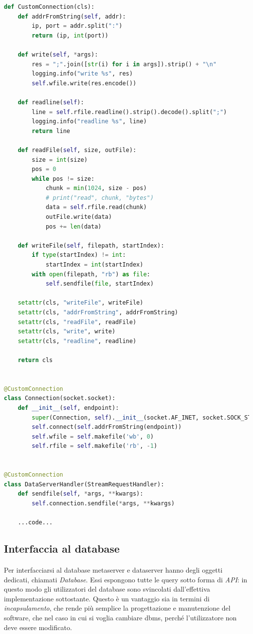 \documentclass[11pt,a4paper,english]{article}
\begin{document}
\begin{lstlisting}[language=Python, title=Codice]
def CustomConnection(cls):
    def addrFromString(self, addr):
        ip, port = addr.split(":")
        return (ip, int(port))

    def write(self, *args):
        res = ";".join([str(i) for i in args]).strip() + "\n"
        logging.info("write %s", res)
        self.wfile.write(res.encode())

    def readline(self):
        line = self.rfile.readline().strip().decode().split(";")
        logging.info("readline %s", line)
        return line

    def readFile(self, size, outFile):
        size = int(size)
        pos = 0
        while pos != size:
            chunk = min(1024, size - pos)
            # print("read", chunk, "bytes")
            data = self.rfile.read(chunk)
            outFile.write(data)
            pos += len(data)

    def writeFile(self, filepath, startIndex):
        if type(startIndex) != int:
            startIndex = int(startIndex)
        with open(filepath, "rb") as file:
            self.sendfile(file, startIndex)

    setattr(cls, "writeFile", writeFile)
    setattr(cls, "addrFromString", addrFromString)
    setattr(cls, "readFile", readFile)
    setattr(cls, "write", write)
    setattr(cls, "readline", readline)

    return cls


@CustomConnection
class Connection(socket.socket):
    def __init__(self, endpoint):
        super(Connection, self).__init__(socket.AF_INET, socket.SOCK_STREAM)
        self.connect(self.addrFromString(endpoint))
        self.wfile = self.makefile('wb', 0)
        self.rfile = self.makefile('rb', -1)


@CustomConnection
class DataServerHandler(StreamRequestHandler):
    def sendfile(self, *args, **kwargs):
        self.connection.sendfile(*args, **kwargs)
    
    ...code...

\end{lstlisting}

\subsection{Interfaccia al database}

\paragraph{} Per interfacciarsi al database metaserver e dataserver hanno degli oggetti dedicati, chiamati \emph{Database}. Essi espongono tutte le query sotto forma di \emph{API}: in questo modo gli utilizzatori del database sono svincolati dall'effettiva implementazione sottostante. Questo è un vantaggio sia in termini di \emph{incapsulamento}, che rende più semplice la progettazione e manutenzione del software, che nel caso in cui si voglia cambiare dbms, perché l'utilizzatore non deve essere modificato. 
\end{document}
